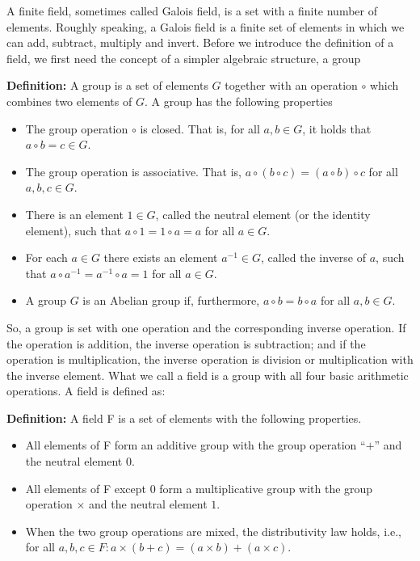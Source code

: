 A finite field, sometimes called Galois field, is a set with a finite number of elements. Roughly speaking, a Galois field is a finite set of elements in which we can add, subtract, multiply and invert. Before we introduce the definition of a field, we first need the concept of a simpler algebraic structure, a group

\vspace{0.25cm}\textbf{Definition:} A group is a set of elements $G$ together with an operation $\circ$ which combines two elements of $G$. A group has the following properties

\begin{itemize}
  \item The group operation $\circ$ is closed. That is, for all $a,b \in G$, it holds that $a \circ b = c \in G$.
  \item The group operation is associative. That is, $a \circ (b \circ c) = (a \circ b) \circ c$ for all $a, b, c \in G$.
  \item There is an element $1 \in G$, called the neutral element (or the identity element), such that $a \circ 1 = 1 \circ a = a$ for all $a \in G$.
  \item For each $a \in G$ there exists an element $a^{-1} \in G$, called the inverse of $a$, such that $a \circ a^{-1} = a^{-1} \circ a = 1$ for all $a \in G$.
  \item A group $G$ is an Abelian group if, furthermore, $a \circ b = b \circ a$ for all $a, b \in G$.
\end{itemize}

So, a group is set with one operation and the corresponding inverse operation. If the operation is addition, the inverse operation is subtraction; and if the operation is multiplication, the inverse operation is division or multiplication with the inverse element. What we call a field is a group with all four basic arithmetic operations. A field is defined as:

\vspace{0.25cm}\textbf{Definition:} A field F is a set of elements with the following properties.
\begin{itemize}
  \item All elements of F form an additive group with the group operation “$+$” and the neutral element $0$.
  \item All elements of F except $0$ form a multiplicative group with the group operation $\times$ and the neutral element $1$.
  \item When the two group operations are mixed, the distributivity law holds, i.e., for all $a, b, c \in F: a \times (b+c) = (a \times b) + (a \times c)$.
\end{itemize}


